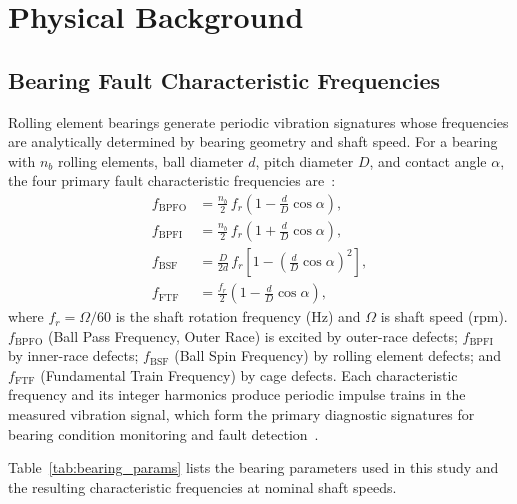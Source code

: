 
\section{Physical Background}
\label{sec:physics}

\subsection{Bearing Fault Characteristic Frequencies}
\label{subsec:phys_freqs}

Rolling element bearings generate periodic vibration signatures whose
frequencies are analytically determined by bearing geometry and shaft speed.
For a bearing with $n_b$ rolling elements, ball diameter $d$, pitch
diameter $D$, and contact angle $\alpha$, the four primary fault
characteristic frequencies are~\cite{randall2011rolling,smith2015rolling}:
\begin{align}
  f_{\text{BPFO}} &= \frac{n_b}{2}\,f_r\!\left(1 - \frac{d}{D}\cos\alpha\right),
  \label{eq:bpfo} \\
  f_{\text{BPFI}} &= \frac{n_b}{2}\,f_r\!\left(1 + \frac{d}{D}\cos\alpha\right),
  \label{eq:bpfi} \\
  f_{\text{BSF}}  &= \frac{D}{2d}\,f_r\!\left[1 - \left(\frac{d}{D}\cos\alpha\right)^2\right],
  \label{eq:bsf}  \\
  f_{\text{FTF}}  &= \frac{f_r}{2}\!\left(1 - \frac{d}{D}\cos\alpha\right),
  \label{eq:ftf}
\end{align}
where $f_r = \Omega/60$ is the shaft rotation frequency (Hz) and $\Omega$
is shaft speed (rpm).
$f_{\text{BPFO}}$ (Ball Pass Frequency, Outer Race) is excited by outer-race
defects; $f_{\text{BPFI}}$ by inner-race defects; $f_{\text{BSF}}$ (Ball
Spin Frequency) by rolling element defects; and $f_{\text{FTF}}$ (Fundamental
Train Frequency) by cage defects.
Each characteristic frequency and its integer harmonics produce periodic
impulse trains in the measured vibration signal, which form the primary
diagnostic signatures for bearing condition monitoring and fault
detection~\cite{lei2020applications,antoni2006spectral_kurtosis}.

Table~\ref{tab:bearing_params} lists the bearing parameters used in this
study and the resulting characteristic frequencies at nominal shaft speeds.

